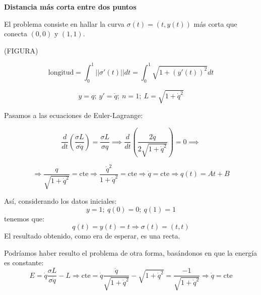 \begin{example}
\textbf{Distancia más corta entre dos puntos}

El problema consiste en hallar la curva $\sigma (t) = (t, y(t))$ más corta que conecta $(0,0)$ y $(1,1)$.

(FIGURA)

$$ \text{longitud} = \int_0^1 || \sigma'(t) || dt = \int_0^1 \sqrt{1 + (y'(t))^2} dt$$

$$y = q; \  y' = \dot{q}; \  n=1; \  L = \sqrt{1 + \dot{q}^2}$$

Pasamos a las ecuaciones de Euler-Lagrange:

$$\frac{d}{dt}\left(\frac{\sigma L}{\sigma \dot{q}}\right) = \frac{\sigma L}{\sigma q} \implies  \frac{d}{dt}\left(\frac{2 \dot{q}}{2 \sqrt{1 + \dot{q}^2}}\right) = 0 \implies$$

$$\Rightarrow \frac{q}{\sqrt{1 + \dot{q}^2}} = \text{cte} \Rightarrow \frac{\dot{q}^2}{1 + \dot{q}^2} = \text{cte} \Rightarrow \dot{q} = \text{cte} \Rightarrow q(t) = At + B $$

Así, considerando los datos iniciales:
\[ y = 1; \  q(0) = 0; \  q(1) = 1\]
tenemos que:
\[q(t) = y(t) = t \Rightarrow \sigma (t) = (t,t)\]
El resultado obtenido, como era de esperar, es una recta.

\begin{obs}
Podríamos haber resulto el problema de otra forma, basándonos en que la energía es constante:
$$E = \dot{q} \frac{\sigma L}{\sigma \dot{q}} - L \Rightarrow \text{cte} = \dot{q} \frac{\dot{q}}{\sqrt{1 + \dot{q}^2}} - \sqrt{1 + \dot{q}^2} = \frac{-1}{\sqrt{1 + \dot{q}^2}} \Rightarrow \dot{q} = \text{cte}$$
\end{obs}

\end{example}


